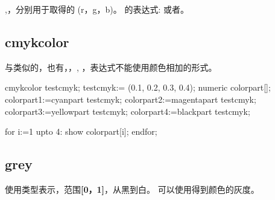 ,，分别用于取得的 (r，g，b)。
的表达式:\newline
{}%
或者。

\subsection{cmykcolor}
\label{subsec:cmykcolor}

\par

与类似的，也有，，,%
，表达式不能使用颜色相加的形式。\par
\begin{mpostcode}
cmykcolor testcmyk;
    testcmyk:= (0.1, 0.2, 0.3, 0.4);
    numeric colorpart[];
    colorpart1:=cyanpart testcmyk;
    colorpart2:=magentapart testcmyk;
    colorpart3:=yellowpart testcmyk;
    colorpart4:=blackpart testcmyk;

    for i:=1 upto 4: show colorpart[i]; endfor;
\end{mpostcode}

\subsection{grey}
\label{subsec:grey}

使用类型表示，范围{\bf [0，1]}，从黑到白。
可以使用得到颜色的灰度。

